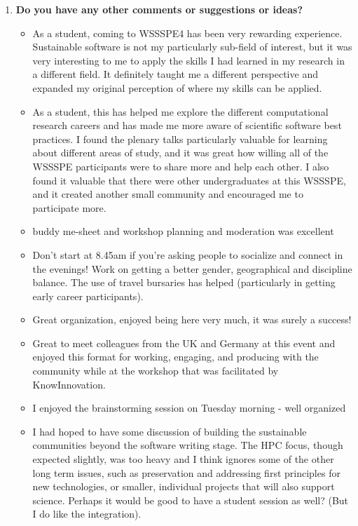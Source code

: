 \begin{enumerate}
\item \textbf{Do you have any other comments or suggestions or ideas?}

\begin{itemize}
\item As a student, coming to WSSSPE4 has been very rewarding experience. Sustainable software is not my particularly sub-field of interest, but it was very interesting to me to apply the skills I had learned in my research in a different field. It definitely taught me a different perspective and expanded my original perception of where my skills can be applied.
\item As a student, this has helped me explore the different computational research careers and has made me more aware of scientific software best practices.  I found the plenary talks particularly valuable for learning about different areas of study, and it was great how willing all of the WSSSPE participants were to share more and help each other. I also found it valuable that there were other undergraduates at this WSSSPE, and it created another small community and encouraged me to participate more.
\item buddy me-sheet and workshop planning and moderation was excellent
\item Don't start at 8.45am if you're asking people to socialize and connect in the evenings! Work on getting a better gender, geographical and discipline balance. The use of travel bursaries has helped (particularly in getting early career participants).
\item Great organization, enjoyed being here very much, it was surely a success!
\item Great to meet colleagues from the UK and Germany at this event and enjoyed this format for working, engaging, and producing with the community while at the workshop that was facilitated by KnowInnovation.
\item I enjoyed the brainstorming session on Tuesday morning - well organized
\item I had hoped to have some discussion of building the sustainable communities beyond the software writing stage. The HPC focus, though expected slightly, was too heavy and I think ignores some of the other long term issues, such as preservation and addressing first principles for new technologies, or smaller, individual projects that will also support science. Perhaps it would be good to have a student session as well? (But I do like the integration).

\end{itemize}
\end{enumerate}
